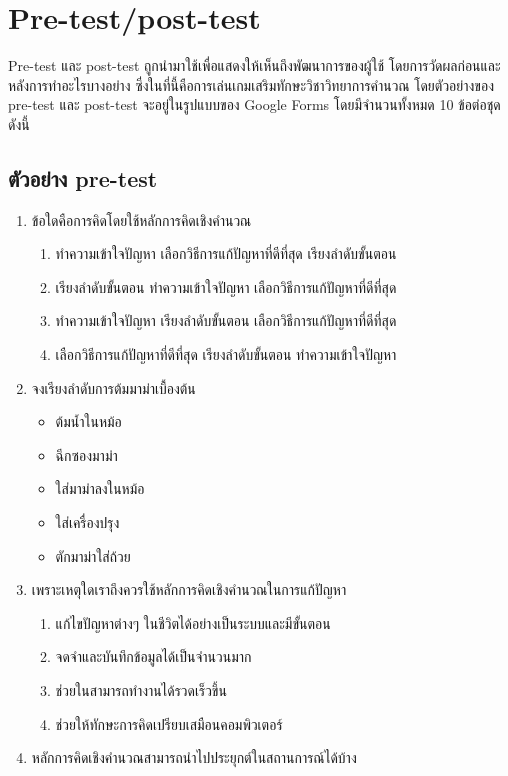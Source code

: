 \chapter{Pre-test/post-test}
Pre-test และ post-test ถูกนำมาใช้เพื่อแสดงให้เห็นถึงพัฒนาการของผู้ใช้ โดยการวัดผลก่อนและหลังการทำอะไรบางอย่าง ซึ่งในที่นี้คือการเล่นเกมเสริมทักษะวิชาวิทยาการคำนวณ
โดยตัวอย่างของ pre-test และ post-test จะอยู่ในรูปแบบของ Google Forms โดยมีจำนวนทั้งหมด 10 ข้อต่อชุด ดังนี้
\section{ตัวอย่าง pre-test}
\begin{enumerate}
    \item ข้อใดคือการคิดโดยใช้หลักการคิดเชิงคำนวณ
    \begin{enumerate}
        \item ทำความเข้าใจปัญหา เลือกวิธีการแก้ปัญหาที่ดีที่สุด เรียงลำดับขั้นตอน
        \item เรียงลำดับขั้นตอน ทำความเข้าใจปัญหา เลือกวิธีการแก้ปัญหาที่ดีที่สุด
        \item ทำความเข้าใจปัญหา เรียงลำดับขั้นตอน เลือกวิธีการแก้ปัญหาที่ดีที่สุด
        \item เลือกวิธีการแก้ปัญหาที่ดีที่สุด เรียงลำดับขั้นตอน ทำความเข้าใจปัญหา
    \end{enumerate}
    \item จงเรียงลำดับการต้มมาม่าเบื้องต้น
    \begin{itemize}
        \item ต้มน้ำในหม้อ
        \item ฉีกซองมาม่า
        \item ใส่มาม่าลงในหม้อ
        \item ใส่เครื่องปรุง
        \item ตักมาม่าใส่ถ้วย
    \end{itemize}
    \item เพราะเหตุใดเราถึงควรใช้หลักการคิดเชิงคำนวณในการแก้ปัญหา
    \begin{enumerate}
        \item แก้ไขปัญหาต่างๆ ในชีวิตได้อย่างเป็นระบบและมีขั้นตอน
        \item จดจำและบันทึกข้อมูลได้เป็นจำนวนมาก
        \item ช่วยในสามารถทำงานได้รวดเร็วขึ้น
        \item ช่วยให้ทักษะการคิดเปรียบเสมือนคอมพิวเตอร์
    \end{enumerate}
    \item หลักการคิดเชิงคำนวณสามารถนำไปประยุกต์ในสถานการณ์ได้บ้าง

\end{enumerate}
